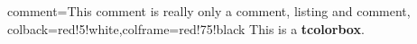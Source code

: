 \documentclass[11pt]{book}
\begin{document}
\begin{tcblisting}{comment={This comment is really only a comment}, listing and comment,
colback=red!5!white,colframe=red!75!black}
This is a \textbf{tcolorbox}.
\end{tcblisting}
\end{document}
